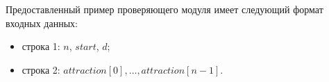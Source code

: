 Предоставленный пример проверяющего модуля имеет следующий формат входных данных:
\begin{itemize}
\item строка 1: $n$, $start$, $d$;
\item строка 2: $attraction[0], \ldots, attraction[n - 1]$.
\end{itemize}